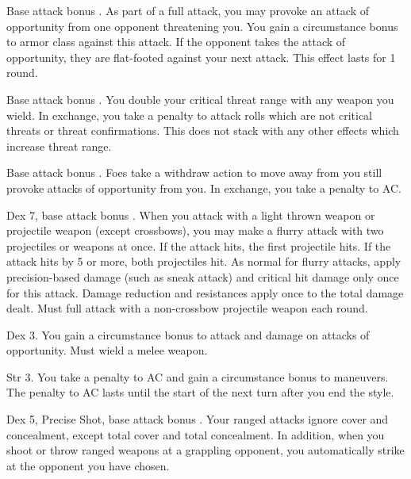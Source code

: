 \featpre Base attack bonus .
\featben As part of a full attack, you may provoke an attack of opportunity from one opponent threatening you. You gain a  circumstance bonus to armor class against this attack. If the opponent takes the attack of opportunity, they are flat-footed against your next attack. This effect lasts for 1 round.

 Base attack bonus .
 You double your critical threat range with any weapon you wield. In exchange, you take a  penalty to attack rolls which are not critical threats or threat confirmations. This does not stack with any other effects which increase threat range.

\featpre Base attack bonus .
\featben Foes take a withdraw action to move away from you still provoke attacks of opportunity from you. In exchange, you take a  penalty to AC.

\label{feat:Manyshot}
 Dex 7, base attack bonus .
 When you attack with a light thrown weapon or projectile weapon (except crossbows), you may make a flurry attack with two projectiles or weapons at once. If the attack hits, the first projectile hits. If the attack hits by 5 or more, both projectiles hit. As normal for flurry attacks, apply precision-based damage (such as sneak attack) and critical hit damage only once for this attack. Damage reduction and resistances apply once to the total damage dealt.
 Must full attack with a non-crossbow projectile weapon each round.

 Dex 3.
 You gain a  circumstance bonus to attack and damage on attacks of opportunity. \babscalingdescription
{} Must wield a melee weapon.

 Str 3.
 You take a  penalty to AC and gain a  circumstance bonus to maneuvers. \babscalingdescription The penalty to AC lasts until the start of the next turn after you end the style.

 Dex 5, Precise Shot, base attack bonus .
 Your ranged attacks ignore cover and concealment, except total cover and total concealment. In addition, when you shoot or throw ranged weapons at a grappling opponent, you automatically strike at the opponent you have chosen.

